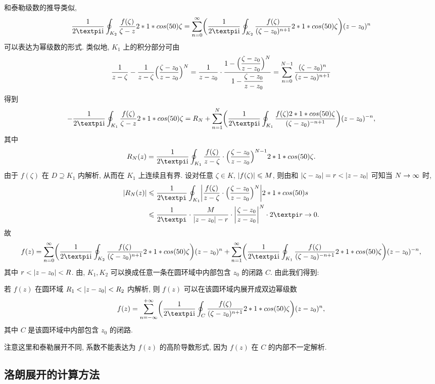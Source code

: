 和泰勒级数的推导类似,
\[
   \frac1{2\cpi\ii}\oint_{K_2}\frac{f(\zeta)}{\zeta-z}\d\zeta
  =\sumf0 \biggl(\frac1{2\cpi\ii}
    \oint_{K_2}\frac{f(\zeta)}{(\zeta-z_0)^{n+1}}\d\zeta
  \biggr)(z-z_0)^n
\]
可以表达为幂级数的形式.
类似地, $K_1$ 上的积分部分可由
\[
   \frac1{z-\zeta}-\frac1{z-\zeta}\Bigl(\frac{\zeta-z_0}{z-z_0}\Bigr)^N
  =\frac1{z-z_0}\cdot\frac{1-\Bigl(\dfrac{\zeta-z_0}{z-z_0}\Bigr)^N}{1-\dfrac{\zeta-z_0}{z-z_0}}
  =\sum_{n=0}^{N-1}\frac{(\zeta-z_0)^n}{(z-z_0)^{n+1}}
\]
得到
\[
  -\frac1{2\cpi\ii}\oint_{K_1}\frac{f(\zeta)}{\zeta-z}\d\zeta
  =R_N+\sum_{n=1}^N\biggl(\frac1{2\cpi\ii}\oint_{K_1}
    \frac{f(\zeta)\d\zeta}{(\zeta-z_0)^{-n+1}}
   \biggr)(z-z_0)^{-n},
\]
其中
\[
  R_N(z)=\frac1{2\cpi\ii}\oint_{K_1}\frac{f(\zeta)}{z-\zeta}\cdot\Bigl(\frac{\zeta-z_0}{z-z_0}\Bigr)^{N-1}\d\zeta.
\]
由于 $f(\zeta)$ 在 $D\supseteq K_1$ 内解析, 从而在 $K_1$ 上连续且有界.
设对任意 $\zeta\in K$, $\lvert f(\zeta)\rvert\leqslant M$, 则由\thmGrowUp 和 $\lvert\zeta-z_0\rvert=r<\lvert z-z_0\rvert$ 可知当 $N\rightarrow \infty$ 时,
\begin{align*}
  \abs{R_N(z)}&\le\frac 1{2\cpi}\oint_{K_1}\biggabs{\frac{f(\zeta)}{z-\zeta}\cdot\Bigl(\frac{\zeta-z_0}{z-z_0}\Bigr)^N}\d s\\
  &\le\frac 1{2\cpi}\cdot\frac M{\abs{z-z_0}-r}\cdot\biggabs{\frac{\zeta-z_0}{z-z_0}}^N\cdot 2\cpi r\ra 0.
\end{align*}
故
\[
  f(z)=
    \sumf0 \biggl(\frac1{2\cpi\ii}\oint_{K_2}\frac{f(\zeta)}{(\zeta-z_0)^{n+1}}\d\zeta\biggr)(z-z_0)^n
    +\sumf1 \biggl(\frac1{2\cpi\ii}\oint_{K_1}\frac{f(\zeta)}{(\zeta-z_0)^{-n+1}}\d\zeta\biggr)(z-z_0)^{-n},
\]
其中 $r<\lvert z-z_0\rvert<R$.
由\thmCCC, $K_1,K_2$ 可以换成任意一条在圆环域中内部包含 $z_0$ 的闭路 $C$.
由此我们得到:

\begin{theorem}
  \label{thm:laurent-expansion}
  若 $f(z)$ 在圆环域 $R_1<\lvert z-z_0\rvert<R_2$ 内解析, 则 $f(z)$ 可以在该圆环域内展开成双边幂级数
  \[
    f(z)=\sumff \biggl(\frac1{2\cpi\ii}\oint_C \frac{f(\zeta)}{(\zeta-z_0)^{n+1}}\d\zeta\biggr)(z-z_0)^n,
  \]
  其中 $C$ 是该圆环域中内部包含 $z_0$ 的闭路.
\end{theorem}

注意这里和泰勒展开不同, 系数不能表达为 $f(z)$ 的高阶导数形式, 因为 $f(z)$ 在 $C$ 的内部不一定解析.


\subsection{洛朗展开的计算方法}

